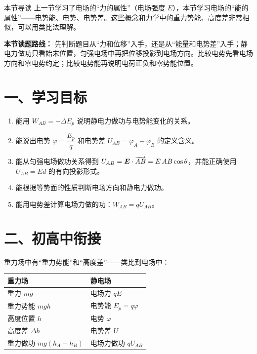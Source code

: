 
\begin{learningbox}{本节导读}
上一节学习了电场的“力的属性”（电场强度 $E$），本节学习电场的“能的属性”——电势能、电势、电势差。这些概念和力学中的重力势能、高度差非常相似，可以用类比法理解。
\end{learningbox}

\textbf{本节读题路线：} 先判断题目从“力和位移”入手，还是从“能量和电势差”入手；静电力做功只看始末位置，匀强电场中再把位移投影到电场方向。比较电势先看电场方向和零电势约定；比较电势能再说明电荷正负和零势能位置。

\section*{一、学习目标}

\begin{enumerate}
  \item 能用 $W_{AB} = -\Delta E_p$ 说明静电力做功与电势能变化的关系。
  \item 能说出电势 $\varphi = \dfrac{E_p}{q}$ 和电势差 $U_{AB} = \varphi_A - \varphi_B$ 的定义含义。
  \item 能从匀强电场做功关系得到
  $U_{AB}=\boldsymbol{E}\cdot\overrightarrow{AB}=E\,AB\cos\theta$，并能正确使用
  $U_{AB}=Ed$ 的有向投影形式。
  \item 能根据等势面的性质判断电场方向和静电力做功。
  \item 能用电势差计算电场力做的功：$W_{AB} = qU_{AB}$。
\end{enumerate}
\section*{二、初高中衔接}

重力场中有“重力势能”和“高度差”——类比到电场中：
\begin{center}
\begin{tabular}{ll}
\toprule
重力场 & 静电场 \\
\midrule
重力 $mg$ & 电场力 $qE$ \\
重力势能 $mgh$ & 电势能 $E_p = q\varphi$ \\
高度位置 $h$ & 电势 $\varphi$ \\
高度差 $\Delta h$ & 电势差 $U$ \\
重力做功 $mg(h_A-h_B)$ & 电场力做功 $qU_{AB}$ \\
\bottomrule
\end{tabular}
\end{center}

